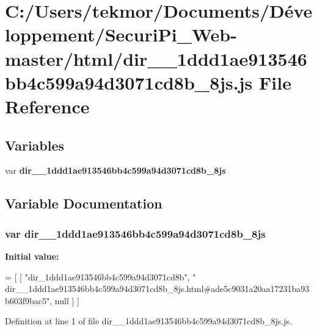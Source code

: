 \section{C\+:/\+Users/tekmor/\+Documents/\+Développement/\+Securi\+Pi\+\_\+\+Web-\/master/html/dir\+\_\+\+\_\+1ddd1ae913546bb4c599a94d3071cd8b\+\_\+8js.js File Reference}
\label{dir____1ddd1ae913546bb4c599a94d3071cd8b__8js_8js}
\subsection*{Variables}
\begin{DoxyCompactItemize}
\item 
var {\bf dir\+\_\+\+\_\+1ddd1ae913546bb4c599a94d3071cd8b\+\_\+8js}
\end{DoxyCompactItemize}


\subsection{Variable Documentation}
\subsubsection[{dir\+\_\+\+\_\+1ddd1ae913546bb4c599a94d3071cd8b\+\_\+8js}]{\setlength{\rightskip}{0pt plus 5cm}var dir\+\_\+\+\_\+1ddd1ae913546bb4c599a94d3071cd8b\+\_\+8js}\label{dir____1ddd1ae913546bb4c599a94d3071cd8b__8js_8js_a18bbbf7ea3bd5f539e7ebfea37ec0d10}
{\bfseries Initial value\+:}
\begin{DoxyCode}
=
[
    [ \textcolor{stringliteral}{"dir\_1ddd1ae913546bb4c599a94d3071cd8b"}, \textcolor{stringliteral}{"
      dir\_\_1ddd1ae913546bb4c599a94d3071cd8b\_8js.html#ade5c9031a20aa17231ba93b603f9bac5"}, null ]
]
\end{DoxyCode}


Definition at line 1 of file dir\+\_\+\+\_\+1ddd1ae913546bb4c599a94d3071cd8b\+\_\+8js.\+js.

